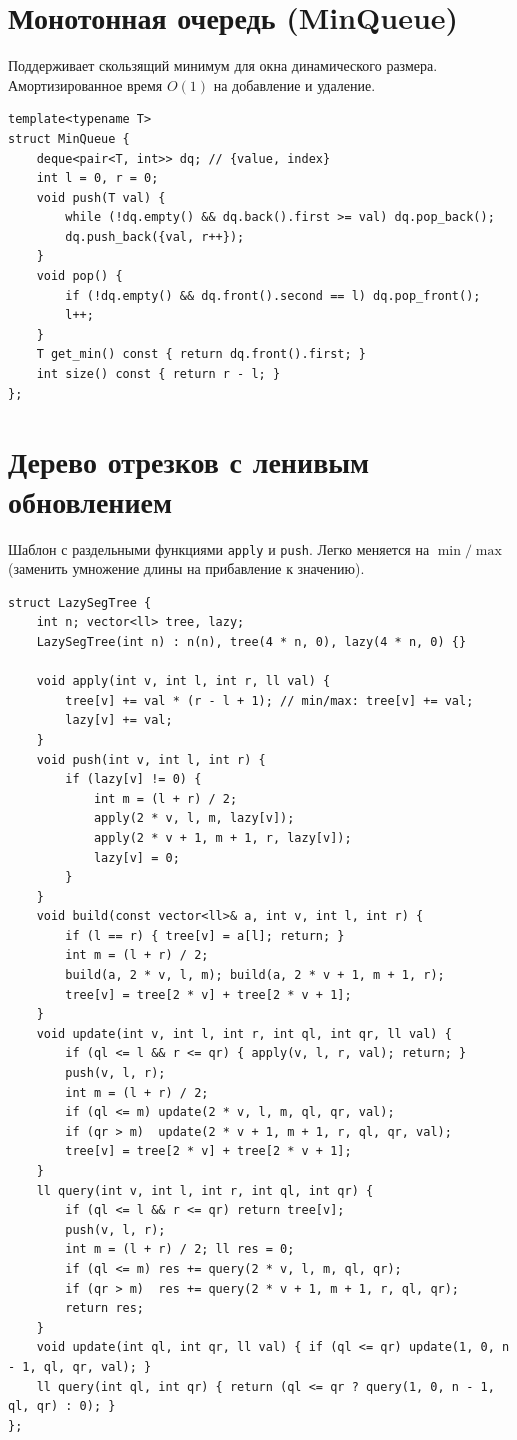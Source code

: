 \section{Монотонная очередь (MinQueue)}
Поддерживает скользящий минимум для окна динамического размера.
Амортизированное время $O(1)$ на добавление и удаление.
\begin{lstlisting}[name=monotonic_queue]
template<typename T>
struct MinQueue {
    deque<pair<T, int>> dq; // {value, index}
    int l = 0, r = 0;
    void push(T val) {
        while (!dq.empty() && dq.back().first >= val) dq.pop_back();
        dq.push_back({val, r++});
    }
    void pop() {
        if (!dq.empty() && dq.front().second == l) dq.pop_front();
        l++;
    }
    T get_min() const { return dq.front().first; }
    int size() const { return r - l; }
};
\end{lstlisting}

\section{Дерево отрезков с ленивым обновлением}
Шаблон с раздельными функциями \texttt{apply} и \texttt{push}.
Легко меняется на $\min/\max$ (заменить умножение длины на прибавление к значению).
\begin{lstlisting}[name=lazy_segtree]
struct LazySegTree {
    int n; vector<ll> tree, lazy;
    LazySegTree(int n) : n(n), tree(4 * n, 0), lazy(4 * n, 0) {}

    void apply(int v, int l, int r, ll val) {
        tree[v] += val * (r - l + 1); // min/max: tree[v] += val;
        lazy[v] += val;
    }
    void push(int v, int l, int r) {
        if (lazy[v] != 0) {
            int m = (l + r) / 2;
            apply(2 * v, l, m, lazy[v]);
            apply(2 * v + 1, m + 1, r, lazy[v]);
            lazy[v] = 0;
        }
    }
    void build(const vector<ll>& a, int v, int l, int r) {
        if (l == r) { tree[v] = a[l]; return; }
        int m = (l + r) / 2;
        build(a, 2 * v, l, m); build(a, 2 * v + 1, m + 1, r);
        tree[v] = tree[2 * v] + tree[2 * v + 1];
    }
    void update(int v, int l, int r, int ql, int qr, ll val) {
        if (ql <= l && r <= qr) { apply(v, l, r, val); return; }
        push(v, l, r);
        int m = (l + r) / 2;
        if (ql <= m) update(2 * v, l, m, ql, qr, val);
        if (qr > m)  update(2 * v + 1, m + 1, r, ql, qr, val);
        tree[v] = tree[2 * v] + tree[2 * v + 1];
    }
    ll query(int v, int l, int r, int ql, int qr) {
        if (ql <= l && r <= qr) return tree[v];
        push(v, l, r);
        int m = (l + r) / 2; ll res = 0;
        if (ql <= m) res += query(2 * v, l, m, ql, qr);
        if (qr > m)  res += query(2 * v + 1, m + 1, r, ql, qr);
        return res;
    }
    void update(int ql, int qr, ll val) { if (ql <= qr) update(1, 0, n - 1, ql, qr, val); }
    ll query(int ql, int qr) { return (ql <= qr ? query(1, 0, n - 1, ql, qr) : 0); }
};
\end{lstlisting}

